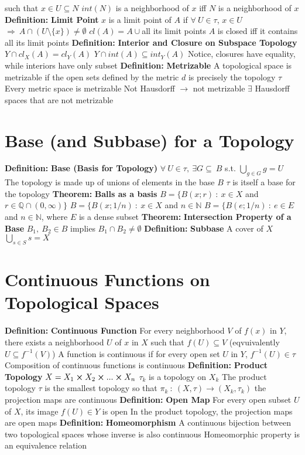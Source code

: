 \documentclass[14pt]{extarticle}
\def\Definition{{\color{Blue} \textbf{Definition:} }}
\def\Theorem{{\color{Red} \textbf{Theorem:} }}
\begin{document}
\begin{outline}
					such that $x \in U \subseteq N$
			\2	$int(N)$ is a neighborhood of $x$ iff $N$ is a neighborhood of $x$
		\1	\Definition \textbf{Limit Point}
			\2	$x$ is a limit point of $A$ if 
					$\forall~U \in \tau$, $x \in U$ $\Rightarrow~A \cap (U \setminus \{x\}) \ne \emptyset$
			\2	$cl(A) = A \cup $all its limit points
			\2	$A$ is closed iff it contains all its limit points
		\1	\Definition \textbf{Interior and Closure on Subspace Topology}
			\2	$Y \cap cl_X(A) = cl_Y(A)$
			\2	$Y \cap int(A) \subseteq int_Y(A)$
				\3	Notice, closures have equality, while interiors have only subset
		\1	\Definition \textbf{Metrizable}
			\2	A topological space is metrizable if the open sets defined by the metric
					$d$ is precisely the topology $\tau$
			\2	Every metric space is metrizable
			\2	Not Hausdorff $\rightarrow$ not metrizable
			\2	$\exists$ Hausdorff spaces that are not metrizable
	\section*{Base  (and Subbase) for a Topology}
		\1	\Definition \textbf{Base (Basis for Topology)}
			\2	$\forall~U \in \tau, ~\exists G \subseteq~B$ s.t. $\bigcup_{g \in G} g = U$
			\2	The topology is made up of unions of elements in the base $B$
			\2	$\tau$ is itself a base for the topology
		\1	\Theorem \textbf{Balls as a basis}
			\2	$B = \{B(x;r)~:~x \in X$ and $r \in \mathbb{Q} \cap (0,\infty)\}$
			\2	$B = \{B(x;1/n)~:~x \in X$ and $n \in \mathbb{N}$
			\2	$B = \{B(e;1/n)~:~e \in E$ and $n \in \mathbb{N}$, where $E$ is a dense subset
		\1	\Theorem \textbf{Intersection Property of a Base}
			\2	$B_1,~B_2 \in B$ implies $B_1 \cap B_2 \ne \emptyset$
		\1	\Definition \textbf{Subbase}
			\2	A cover of $X$
			\2	$\bigcup_{s \in S} s = X$
	\section*{Continuous Functions on Topological Spaces}
		\1	\Definition \textbf{Continuous Function}
			\2	For every neighborhood $V$ of $f(x)$ in $Y$, there exists a
					neighborhood $U$ of $x$ in $X$ such that $f(U) \subseteq V$ 
					(eqvuivalently $U \subseteq f^{-1}(V)$)
			\2	A function is continuous if for every open set $U$ in $Y$, 
					$f^{-1}(U) \in \tau$
			\2	Composition of continuous functions is continuous
		\1	\Definition \textbf{Product Topology}
			\2	$X = X_1 \cross X_2 \cross ... \cross X_n$
			\2	$\tau_k$ is a topology on $X_k$
			\2	The product topology $\tau$ is the smallest topology so 
					that $\pi_k~:~(X,\tau) \rightarrow (X_k,\tau_k)$ the projection
					maps are continuous
		\1	\Definition \textbf{Open Map}
			\2	For every open subset $U$ of $X$, its image $f(U) \in Y$ is open
			\2	In the product topology, the projection maps are open maps
		\1	\Definition \textbf{Homeomorphism}
			\2	A continuous bijection between two topological spaces whose inverse
					is also continuous
			\2	Homeomorphic property is an equivalence relation
	\end{outline}
\end{document}
